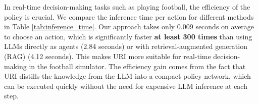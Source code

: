 In real-time decision-making tasks such as playing football, the efficiency of the policy is crucial. We compare the inference time per action for different methods in Table \ref{tab:inference_time}. Our approach takes only 0.009 seconds on average to choose an action, which is significantly faster \textbf{at least 300 times} than using LLMs directly as agents (2.84 seconds) or with retrieval-augmented generation (RAG) (4.12 seconds). This makes URI more suitable for real-time decision-making in the football simulator. The efficiency gain comes from the fact that URI distills the knowledge from the LLM into a compact policy network, which can be executed quickly without the need for expensive LLM inference at each step.






\vspace{-1mm}
